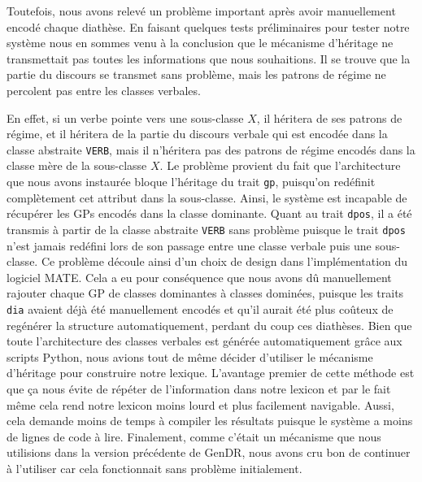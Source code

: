 Toutefois, nous avons relevé un problème important après avoir manuellement encodé chaque diathèse. En faisant quelques tests préliminaires pour tester notre système nous en sommes venu à la conclusion que le mécanisme d'héritage ne transmettait pas toutes les informations que nous souhaitions. Il se trouve que la partie du discours se transmet sans problème, mais les patrons de régime ne percolent pas entre les classes verbales. 

En effet, si un verbe pointe vers une sous-classe $X$, il héritera de ses patrons de régime, et il héritera de la partie du discours verbale qui est encodée dans la classe abstraite \texttt{VERB}, mais il n'héritera pas des patrons de régime encodés dans la classe mère de la sous-classe $X$. Le problème provient du fait que l'architecture que nous avons instaurée bloque l'héritage du trait \texttt{gp}, puisqu'on redéfinit complètement cet attribut dans la sous-classe. Ainsi, le système est incapable de récupérer les \acp{GP} encodés dans la classe dominante. Quant au trait \texttt{dpos}, il a été transmis à partir de la classe abstraite \texttt{VERB} sans problème puisque le trait \texttt{dpos} n'est jamais redéfini lors de son passage entre une classe verbale puis une sous-classe. Ce problème découle ainsi d'un choix de design dans l'implémentation du logiciel MATE. Cela a eu pour conséquence que nous avons dû manuellement rajouter chaque \ac{GP} de classes dominantes à classes dominées, puisque les traits \texttt{dia} avaient déjà été manuellement encodés et qu'il aurait été plus coûteux de regénérer la structure automatiquement, perdant du coup ces diathèses. Bien que toute l'architecture des classes verbales est générée automatiquement grâce aux scripts Python, nous avions tout de même décider d'utiliser le mécanisme d'héritage pour construire notre lexique. L'avantage premier de cette méthode est que ça nous évite de répéter de l'information dans notre lexicon et par le fait même cela rend notre lexicon moins lourd et plus facilement navigable. Aussi, cela demande moins de temps à compiler les résultats puisque le système a moins de lignes de code à lire. Finalement, comme c'était un mécanisme que nous utilisions dans la version précédente de GenDR, nous avons cru bon de continuer à l'utiliser car cela fonctionnait sans problème initialement.

